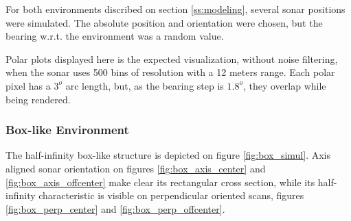 For both environments discribed on section \ref{ss:modeling}, several sonar
positions were simulated. The absolute position and orientation were chosen, but
the bearing w.r.t. the environment was a random value.

Polar plots displayed here is the expected visualization, without noise
filtering, when the sonar uses 500 bins of resolution with a 12 meters range.
Each polar pixel has a $3^o$ arc length, but, as the bearing step is $1.8^o$,
they overlap while being rendered.

\subsubsection{Box-like Environment}
The half-infinity box-like structure is depicted on figure
\ref{fig:box_simul}. Axis aligned sonar orientation on figures
\ref{fig:box_axis_center} and \ref{fig:box_axis_offcenter} make clear its
rectangular cross section, while its half-infinity characteristic is visible on
perpendicular oriented scans, figures \ref{fig:box_perp_center} and
\ref{fig:box_perp_offcenter}.


